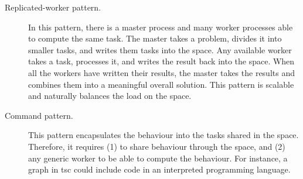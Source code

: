 \begin{description}
  \item[Replicated-worker pattern.] In this pattern, there is a master process and many worker processes able to compute the same task.
				    The master takes a problem, divides it into smaller tasks, and writes them tasks into the space.
				    Any available worker takes a task, processes it, and writes the result back into the space.
				    When all the workers have written their results, the master takes the results and combines them into a meaningful overall solution.
				    This pattern is scalable and naturally balances the load on the space.
  \item[Command pattern.] This pattern encapsulates the behaviour into the tasks shared in the space.
			  Therefore, it requires (1) to share behaviour through the space, and (2) any generic worker to be able to compute the behaviour.
			  For instance, a graph in \ac{tsc} could include code in an interpreted programming language.

\end{description}
